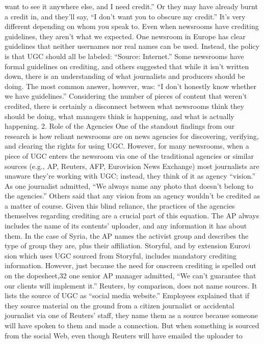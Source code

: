 \begin{enumerate}
want to see it anywhere else, and I need credit.'' Or they may have
already burnt a credit in, and they'll say, ``I don't want you to obscure
my credit.'' It's very different depending on whom you speak to.
Even when newsrooms have crediting guidelines, they aren't what we
expected. One newsroom in Europe has clear guidelines that neither usernames
nor real names can be used. Instead, the policy is that UGC should
all be labeled: ``Source: Internet.''
Some newsrooms have formal guidelines on crediting, and others suggested
that while it isn't written down, there is an understanding of what journalists
and producers should be doing. The most common answer, however,
was: ``I don't honestly know whether we have guidelines.'' Considering the
number of pieces of content that weren't credited, there is certainly a disconnect
between what newsrooms think they should be doing, what managers
think is happening, and what is actually happening.
2. Role of the Agencies
One of the standout findings from our research is how reliant newsrooms
are on news agencies for discovering, verifying, and clearing the rights for
using UGC. However, for many newsrooms, when a piece of UGC enters
the newsroom via one of the traditional agencies or similar sources (e.g.,
AP, Reuters, AFP, Eurovision News Exchange) most journalists are unaware
they're working with UGC; instead, they think of it as agency ``vision.'' As
one journalist admitted, ``We always name any photo that doesn't belong to
the agencies.'' Others said that any vision from an agency wouldn't be credited
as a matter of course.
Given this blind reliance, the practices of the agencies themselves regarding
crediting are a crucial part of this equation. The AP always includes the
name of its contents' uploader, and any information it has about them. In
the case of Syria, the AP names the activist group and describes the type
of group they are, plus their affiliation. Storyful, and by extension Eurovi
sion which uses UGC sourced from Storyful, includes mandatory crediting
information. However, just because the need for onscreen crediting is
spelled out on the dopesheet,32 one senior AP manager admitted, ``We can't
guarantee that our clients will implement it.''
Reuters, by comparison, does not name sources. It lists the source of UGC
as ``social media website.'' Employees explained that if they source material
on the ground from a citizen journalist or accidental journalist via one
of Reuters' staff, they name them as a source because someone will have
spoken to them and made a connection. But when something is sourced
from the social Web, even though Reuters will have emailed the uploader to

\end{enumerate}
